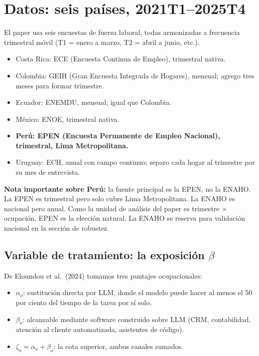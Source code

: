 \documentclass[12pt]{article}
\begin{document}
\section{Datos: seis países, 2021T1--2025T4}

El paper usa seis encuestas de fuerza laboral, todas armonizadas a frecuencia trimestral móvil (T1 = enero a marzo, T2 = abril a junio, etc.).

\begin{itemize}
  \item Costa Rica: ECE (Encuesta Continua de Empleo), trimestral nativa.
  \item Colombia: GEIH (Gran Encuesta Integrada de Hogares), mensual; agrego tres meses para formar trimestre.
  \item Ecuador: ENEMDU, mensual; igual que Colombia.
  \item México: ENOE, trimestral nativa.
  \item \textbf{Perú: EPEN (Encuesta Permanente de Empleo Nacional), trimestral, Lima Metropolitana.}
  \item Uruguay: ECH, anual con campo continuo; separo cada hogar al trimestre por su mes de entrevista.
\end{itemize}

\textbf{Nota importante sobre Perú:} la fuente principal es la EPEN, no la ENAHO. La EPEN es trimestral pero solo cubre Lima Metropolitana. La ENAHO es nacional pero anual. Como la unidad de análisis del paper es trimestre $\times$ ocupación, EPEN es la elección natural. La ENAHO se reserva para validación nacional en la sección de robustez.

\subsection{Variable de tratamiento: la exposición $\beta$}

De Eloundou et al.\ (2024) tomamos tres puntajes ocupacionales:

\begin{itemize}
  \item $\alpha_o$: sustitución directa por LLM, donde el modelo puede hacer al menos el 50 por ciento del tiempo de la tarea por sí solo.
  \item $\beta_o$: alcanzable mediante software construido sobre LLM (CRM, contabilidad, atención al cliente automatizada, asistentes de código).
  \item $\zeta_o = \alpha_o + \beta_o$: la cota superior, ambos canales sumados.
\end{itemize}
\end{document}
